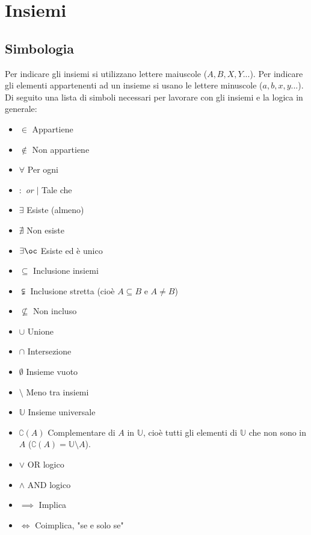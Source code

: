 \section{Insiemi}
\subsection{Simbologia}
Per indicare gli insiemi si utilizzano lettere maiuscole ($A, B, X, Y ...$). 
Per indicare gli elementi appartenenti ad un insieme si usano le lettere 
minuscole ($a, b, x, y ...$). Di seguito una lista di simboli necessari per 
lavorare con gli insiemi e la logica in generale:

\begin{multicols}{2}

\begin{itemize}
    \item $\in$ \qquad Appartiene
    \item $\notin$ \qquad Non appartiene
    \item $\forall$ \qquad Per ogni
    \item $:$ \textit{or} $|$ \qquad Tale che
    \item $\exists$ \qquad Esiste (almeno)
    \item $\nexists$ \qquad Non esiste
    \item $\exists \oc$ \qquad Esiste ed è unico
    
    \item $\subseteq$ \qquad Inclusione insiemi
    \item $\subsetneqq$ \qquad Inclusione stretta (cioè $A \subseteq B$ e $A 
        \neq B$)
    \item $\nsubseteq$ \qquad Non incluso
    
    \item $\cup$ \qquad Unione
    \item $\cap$ \qquad Intersezione
    \item $\emptyset$ \qquad Insieme vuoto
    \item $\setminus$ \qquad Meno tra insiemi
    \item $\mathbb{U}$ \qquad Insieme universale
    \item $\complement \left(A\right)$ \qquad Complementare di $A$ in 
        $\mathbb{U}$, cioè tutti gli elementi di $\mathbb{U}$ che non sono in 
        $A$ ($\complement \left(A\right) = \mathbb{U} \setminus A$).
    
    \item $\lor$ \qquad OR logico
    \item $\land$ \qquad AND logico
    \item $\implies$ \qquad Implica
    \item $\iff$ \qquad Coimplica, "se e solo se" 
\end{itemize}
\end{multicols}

